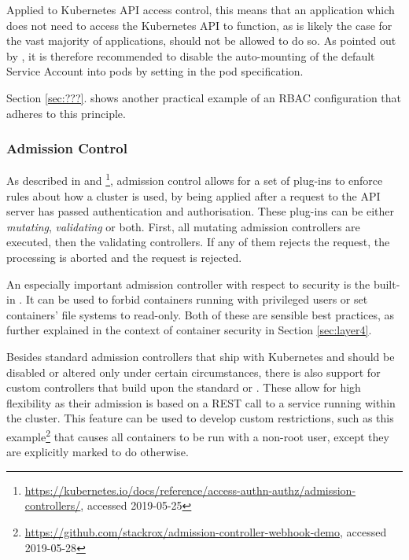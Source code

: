 Applied to Kubernetes API access control, this means that an application which does not need to access the Kubernetes API to function, as is likely the case for the vast majority of applications, should not be allowed to do so. As pointed out by \textcite{kubernetessecurity}, it is therefore recommended to disable the auto-mounting of the default Service Account into pods by setting  in the pod specification. 



Section \ref{sec:???}. shows another practical example of an \ac{RBAC} configuration that adheres to this principle.



\subsubsection{Admission Control} \label{ssec:admissionControl}

As described in \cite{admissionControl} and \cite{k8sdocs}\footnote{\url{https://kubernetes.io/docs/reference/access-authn-authz/admission-controllers/}, accessed 2019-05-25}, admission control allows for a set of plug-ins to enforce rules about how a cluster is used, by being applied after a request to the API server has passed authentication and authorisation. These plug-ins can be either \textit{mutating}, \textit{validating} or both. First, all mutating admission controllers are executed, then the validating controllers. If any of them rejects the request, the processing is aborted and the request is rejected.

An especially important admission controller with respect to security is the built-in . It can be used to forbid containers running with privileged users or set containers' file systems to read-only. Both of these are sensible best practices, as further explained in the context of container security in Section \ref{sec:layer4}.

Besides standard admission controllers that ship with Kubernetes and should be disabled or altered only under certain circumstances, there is also support for custom controllers that build upon the standard  or . These allow for high flexibility as their admission is based on a REST call to a service running within the cluster. This feature can be used to develop custom restrictions, such as this example\footnote{\url{https://github.com/stackrox/admission-controller-webhook-demo}, accessed 2019-05-28} that causes all containers to be run with a non-root user, except they are explicitly marked to do otherwise. 

